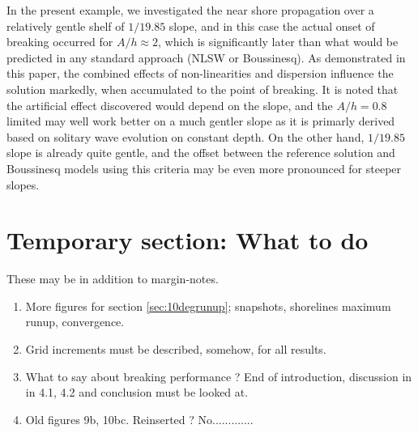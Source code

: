 \documentclass[review]{elsarticle}
\newcommand{\BoussClaw}{\textsc{BoussClaw} }
\begin{document}
In the present example, we investigated the near shore propagation over a relatively gentle shelf of $1/19.85$ slope,
and in this case the actual onset of breaking occurred for $A/h \approx 2$, which is significantly later
than what would be predicted in any standard approach (NLSW or Boussinesq). As demonstrated in this paper,
the combined effects of non-linearities and dispersion influence the solution markedly, when accumulated to the point
of breaking. It is noted that the artificial effect discovered would depend on the slope, 
and the $A/h=0.8$ limited may well work better on a much gentler slope as it is primarly derived based on 
solitary wave evolution on constant depth. On the other hand, $1/19.85$ slope is already quite gentle,
and the offset between the reference solution and Boussinesq models using this criteria may
be even more pronounced for steeper slopes.


\section*{Temporary section: What to do}
These may be in addition to margin-notes.
\begin{enumerate}
\item More figures for section \ref{sec:10degrunup}; snapshots, shorelines 
maximum runup, convergence.
\item Grid increments must be described, somehow, for all results.
\item What to say about breaking performance ? End of introduction, discussion in in 4.1, 4.2 and conclusion must be looked at.
\item Old figures 9b, 10bc. Reinserted ? No.............
\end{enumerate}
\end{document}
